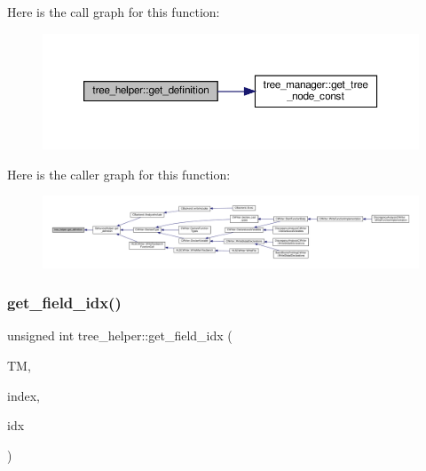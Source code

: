 Here is the call graph for this function\+:
\nopagebreak
\begin{figure}[H]
\begin{center}
\leavevmode
\includegraphics[width=350pt]{d7/d99/classtree__helper_afcc09a263c77cec37dd370199cc7b81f_cgraph}
\end{center}
\end{figure}
Here is the caller graph for this function\+:
\nopagebreak
\begin{figure}[H]
\begin{center}
\leavevmode
\includegraphics[width=350pt]{d7/d99/classtree__helper_afcc09a263c77cec37dd370199cc7b81f_icgraph}
\end{center}
\end{figure}
\mbox{\label{classtree__helper_a421a616c7a58cf4de41549f3e0a3efcb}} 
\subsubsection{\texorpdfstring{get\+\_\+field\+\_\+idx()}{get\_field\_idx()}}
{\footnotesize\ttfamily unsigned int tree\+\_\+helper\+::get\+\_\+field\+\_\+idx (\begin{DoxyParamCaption}\item[{const \hyperlink{tree__manager_8hpp_a792e3f1f892d7d997a8d8a4a12e39346}{tree\+\_\+manager\+Const\+Ref}}]{TM,  }\item[{const unsigned int}]{index,  }\item[{unsigned int}]{idx }\end{DoxyParamCaption})\hspace{0.3cm}{\ttfamily [static]}}



